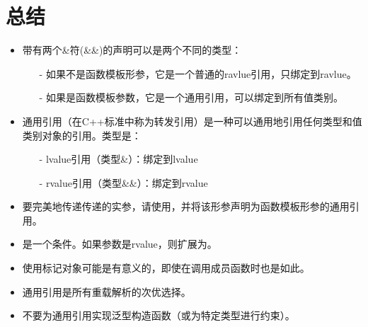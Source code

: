 \section{总结}
\begin{itemize}
	\item 带有两个\&符(\&\&)的声明可以是两个不同的类型：
	\begin{itemize}
		\item[-] 如果不是函数模板形参，它是一个普通的ravlue引用，只绑定到ravlue。
		\item[-] 如果是函数模板参数，它是一个通用引用，可以绑定到所有值类别。
	\end{itemize}
	\item 通用引用（在C++标准中称为转发引用）是一种可以通用地引用任何类型和值类别对象的引用。类型是：
		\begin{itemize}
		\item[-] lvalue引用（类型\&）：绑定到lvalue
		\item[-] rvalue引用（类型\&\&）：绑定到rvalue
	\end{itemize}
	\item 要完美地传递传递的实参，请使用，并将该形参声明为函数模板形参的通用引用。
	\item {}是一个条件。如果参数是rvalue，则扩展为。
	\item 使用标记对象可能是有意义的，即使在调用成员函数时也是如此。
	\item 通用引用是所有重载解析的次优选择。
	\item 不要为通用引用实现泛型构造函数（或为特定类型进行约束）。
\end{itemize}



